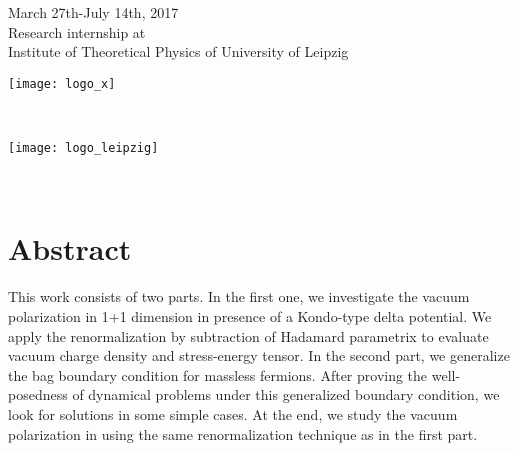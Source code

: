\begin{titlepage}


{\large March 27th-July 14th, 2017 \\Research internship at \\ Institute of Theoretical Physics of University of Leipzig}\\[1cm] %


\begin{minipage}{0.4\textwidth}
\begin{flushleft} \large
\texttt{[image: logo\_x]}\\[1cm] %
  
\end{flushleft}
\end{minipage}\\[1cm]
\begin{minipage}{0.4\textwidth}
\begin{flushright} \large
\texttt{[image: logo\_leipzig]}\\[1cm] %
  
\end{flushright}
\end{minipage}\\[1cm]

\vfill %

\end{titlepage}


\section*{Abstract}
This work consists of two parts.
In the first one, we investigate the vacuum polarization in 1+1 dimension in presence of a Kondo-type delta potential.
We apply the renormalization by subtraction of Hadamard parametrix to evaluate vacuum charge density and stress-energy tensor.
In the second part, we generalize the bag boundary condition for massless fermions.
After proving the well-posedness of dynamical problems under this generalized boundary condition, we look for solutions in some simple cases.
At the end, we study the vacuum polarization in using the same renormalization technique as in the first part.

